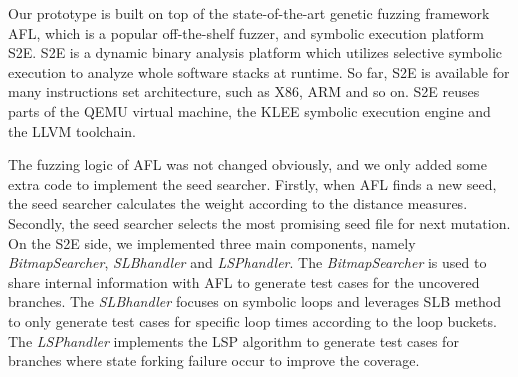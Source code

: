 Our prototype is built on top of the state-of-the-art genetic fuzzing framework AFL, which is a popular off-the-shelf fuzzer, and symbolic execution platform S2E. S2E is a dynamic binary analysis platform which utilizes selective symbolic execution to analyze whole software stacks at runtime. So far, S2E is available for many instructions set architecture, such as X86, ARM and so on. S2E reuses parts of the QEMU virtual machine, the KLEE symbolic execution engine and the LLVM toolchain.

The fuzzing logic of AFL was not changed obviously, and we only added some extra code to implement the seed searcher. Firstly, when AFL finds a new seed, the seed searcher calculates the weight according to the distance measures. Secondly, the seed searcher selects the most promising seed file for next mutation. On the S2E side, we implemented three main components, namely \textit{BitmapSearcher}, \textit{SLBhandler} and \textit{LSPhandler}. The \textit{BitmapSearcher} is used to share internal information with AFL to generate test cases for the uncovered branches. The \textit{SLBhandler} focuses on symbolic loops and leverages SLB method to only generate test cases for specific loop times according to the loop buckets. The \textit{LSPhandler} implements the LSP algorithm to generate test cases for branches where state forking failure occur to improve the coverage.
